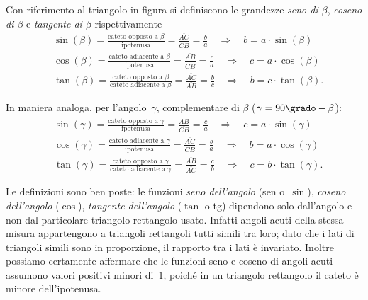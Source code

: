 \begin{definizione}
Con riferimento al triangolo in figura si definiscono le grandezze \emph{seno di $\beta$}, \emph{coseno di $\beta$} e \emph{tangente di $\beta$} rispettivamente
\begin{align*}
&\sin(\beta)=\frac{\text{cateto opposto a }\beta}{\text{ipotenusa}}=\frac{\overline{AC}}{\overline{CB}}=\frac{b}{a}\quad\Rightarrow\quad b=a\cdot \sin(\beta)\\
&\cos(\beta)=\frac{\text{cateto adiacente a }\beta}{\text{ipotenusa}}=\frac{\overline{AB}}{\overline{CB}}=\frac{c}{a}\quad\Rightarrow\quad c=a\cdot \cos(\beta)\\
&\tan(\beta)=\frac{\text{cateto opposto a }\beta}{\text{cateto adiacente a }\beta}=\frac{\overline{AC}}{\overline{AB}}=\frac{b}{c}\quad\Rightarrow\quad b=c\cdot \tan(\beta).
\end{align*}
\end{definizione}


\begin{definizione}
In maniera analoga, per l'angolo~$\gamma$, complementare di $\beta$ ($\gamma =90\grado - \beta$):
\begin{align*}
&\sin(\gamma)=\frac{\text{cateto opposto a }\gamma}{\text{ipotenusa}}=\frac{\overline{AB}}{\overline{CB}}=\frac{c}{a}\quad\Rightarrow\quad c=a\cdot \sin(\gamma)\\
&\cos(\gamma)=\frac{\text{cateto adiacente a }\gamma}{\text{ipotenusa}}=\frac{\overline{AC}}{\overline{CB}}=\frac{b}{a}\quad\Rightarrow\quad b=a\cdot \cos(\gamma)\\
&\tan(\gamma)=\frac{\text{cateto opposto a }\gamma}{\text{cateto adiacente a }\gamma}=\frac{\overline{AB}}{\overline{AC}}=\frac{c}{b}\quad\Rightarrow\quad c=b\cdot \tan(\gamma).
\end{align*}
\end{definizione}

Le definizioni sono ben poste: le funzioni \emph{seno dell'angolo} (sen o~$\sin$), \emph{coseno dell'angolo} ($\cos$), \emph{tangente dell'angolo}
($\tan$ o tg) dipendono solo dall'angolo e non dal particolare triangolo rettangolo usato. Infatti angoli acuti della stessa misura appartengono a
triangoli rettangoli tutti simili tra loro; dato che i lati di triangoli simili sono in proporzione, il rapporto tra i lati è invariato.
Inoltre possiamo certamente affermare che le funzioni seno e coseno di angoli acuti assumono valori positivi minori di~$1$,
poiché in un triangolo rettangolo il cateto è minore dell'ipotenusa.

